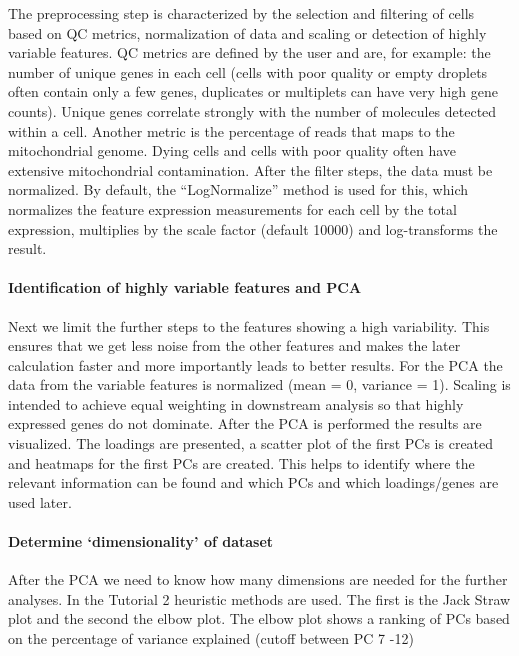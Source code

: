 \documentclass[a4paper, 10pt]{scrartcl}
\begin{document}
The preprocessing step is characterized by the selection and filtering
of cells based on QC metrics, normalization of data and scaling or
detection of highly variable features. QC metrics are defined by the
user and are, for example: the number of unique genes in each cell
(cells with poor quality or empty droplets often contain only a few
genes, duplicates or multiplets can have very high gene counts). Unique
genes correlate strongly with the number of molecules detected within a
cell. Another metric is the percentage of reads that maps to the
mitochondrial genome. Dying cells and cells with poor quality often have
extensive mitochondrial contamination. After the filter steps, the data
must be normalized. By default, the ``LogNormalize'' method is used for
this, which normalizes the feature expression measurements for each cell
by the total expression, multiplies by the scale factor (default 10000)
and log-transforms the result.

\hypertarget{identification-of-highly-variable-features-and-pca}{%
\paragraph{Identification of highly variable features and
PCA}\label{identification-of-highly-variable-features-and-pca}}

Next we limit the further steps to the features showing a high
variability. This ensures that we get less noise from the other features
and makes the later calculation faster and more importantly leads to
better results. For the PCA the data from the variable features is
normalized (mean = 0, variance = 1). Scaling is intended to achieve
equal weighting in downstream analysis so that highly expressed genes do
not dominate. After the PCA is performed the results are visualized. The
loadings are presented, a scatter plot of the first PCs is created and
heatmaps for the first PCs are created. This helps to identify where the
relevant information can be found and which PCs and which loadings/genes
are used later.

\hypertarget{determine-dimensionality-of-dataset}{%
\paragraph{Determine `dimensionality' of
dataset}\label{determine-dimensionality-of-dataset}}

After the PCA we need to know how many dimensions are needed for the
further analyses. In the Tutorial 2 heuristic methods are used. The
first is the Jack Straw plot and the second the elbow plot. The elbow
plot shows a ranking of PCs based on the percentage of variance
explained (cutoff between PC 7 -12)
\end{document}
